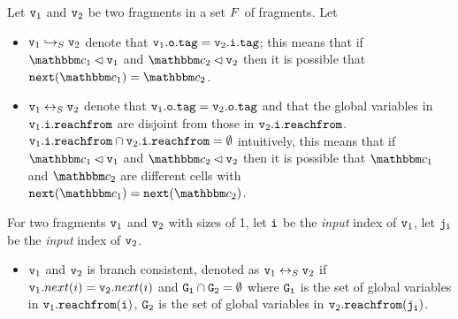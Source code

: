 Let $\mathtt{v}_1$ and $\mathtt{v}_2$ be two fragments in a set $F$ of fragments.
Let
\begin{itemize}
\item  $\mathtt{v}_1 \hookrightarrow_S \mathtt{v}_2$ denote that $\mathtt{v}_1.\mathtt{o}.\mathtt{tag} = \mathtt{v}_2.\mathtt{i}.\mathtt{tag}$;
   
  this means that if
  $\cell_1 \lhd \frag_1$ and  $\cell_2 \lhd \frag_2$ then it is possible that
  $\mathtt{next}(\cell_1) = \cell_2$.
\item  $\mathtt{v}_1 \leftrightarrow_S \mathtt{v}_2$ denote that $\mathtt{v}_1.\mathtt{o}.\mathtt{tag} = \mathtt{v}_2.\mathtt{o}.\mathtt{tag}$ and that 
  the global variables in  $\mathtt{v}_1.\mathtt{i}.\mathtt{reachfrom}$ are disjoint from
  those in $\mathtt{v}_2.\mathtt{i}.\mathtt{reachfrom}$.
  $\mathtt{v}_1.\mathtt{i}.\mathtt{reachfrom} \cap \mathtt{v}_2.\mathtt{i}.\mathtt{reachfrom} = \emptyset$ 
  intuitively, this means that if
  $\cell_1 \lhd \frag_1$ and  $\cell_2 \lhd \frag_2$ then it is possible that
  $\cell_1$ and $\cell_2$ are different cells with
  $\mathtt{next}(\cell_1) = \mathtt{next}(\cell_2)$.
\end{itemize}
For two fragments $\mathtt{v}_1$ and $\mathtt{v}_2$ with sizes of 1, let $\tt i$ be the {\em input} index of $\mathtt{v}_1$, let $\tt j_i$ be the {\em input} index of $\mathtt{v}_2$.
 \begin{itemize}
 \item $\mathtt{v}_1$ and $\mathtt{v}_2$ is branch consistent, denoted as $\mathtt{v}_1 \leftrightarrow_S \mathtt{v}_2$ if $\mathtt{v}_1.next(i) = \mathtt{v}_2.next(i)$ and $\tt G_1 \cap G_2 = \emptyset$ where $\tt G_1$ is the set of global variables in $\mathtt{v}_1.{\tt reachfrom}(\tt i)$,  $\tt G_2$ is the set of global variables in $\mathtt{v}_2.{\tt reachfrom}(\tt j_i)$.
 \end{itemize}

